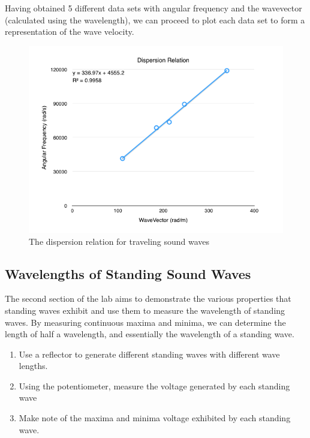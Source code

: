 \documentclass{article}
\begin{document}
Having obtained 5 different data sets with angular frequency and the wavevector
(calculated using the wavelength), we can proceed to plot each data set to form
a representation of the wave velocity.

\begin{figure}[H]
    \centering
    \includegraphics[width=\textwidth]{charts/dispersion_relation}
    \caption{The dispersion relation for traveling sound waves}
    \label{dispersion_relation}
\end{figure}

\subsection{Wavelengths of Standing Sound Waves}

The second section of the lab aims to demonstrate the various properties that
standing waves exhibit and use them to measure the wavelength of standing waves.
By measuring continuous maxima and minima, we can determine the length of half a
wavelength, and essentially the wavelength of a standing wave.

\begin{enumerate}
    \item Use a reflector to generate different standing waves with different
    wave lengths.
    \item Using the potentiometer, measure the voltage generated by each
    standing wave
    \item Make note of the maxima and minima voltage exhibited by each standing
    wave.
\end{enumerate}
\end{document}
